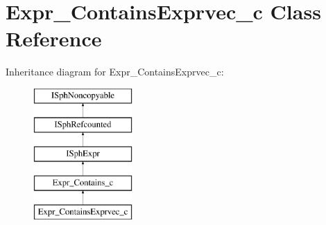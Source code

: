 \hypertarget{classExpr__ContainsExprvec__c}{\section{Expr\-\_\-\-Contains\-Exprvec\-\_\-c Class Reference}
\label{classExpr__ContainsExprvec__c}
}
Inheritance diagram for Expr\-\_\-\-Contains\-Exprvec\-\_\-c\-:\begin{figure}[H]
\begin{center}
\leavevmode
\includegraphics[height=5.000000cm]{classExpr__ContainsExprvec__c}
\end{center}
\end{figure}
